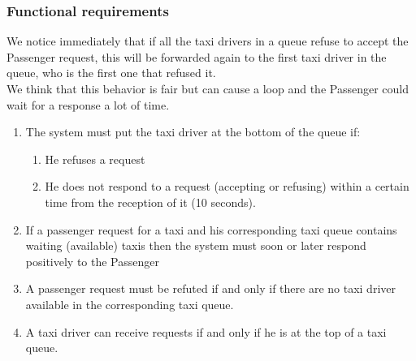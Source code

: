 \subsubsection{Functional requirements}
We notice immediately that if all the taxi drivers in a queue refuse to accept the Passenger request, this will be forwarded again to the first taxi driver in the queue, who is the first one that refused it.
\\ We think that this behavior is fair but can cause a loop and the Passenger could wait for a response a lot of time.\\
\begin{enumerate}
\item The system must put the taxi driver at the bottom of the queue if:
\begin{enumerate}
	\item He refuses a request
	\item He does not respond to a request (accepting or refusing) within a certain time from the reception of it (10 seconds).
\end{enumerate}
\item If a passenger request for a taxi and his corresponding taxi queue contains waiting (available) taxis then the system must soon or later respond positively to the Passenger
\item A passenger request must be refuted if and only if there are no taxi driver available in the corresponding taxi queue.
\item A taxi driver can receive requests if and only if he is at the top of a taxi queue.
\end{enumerate}

